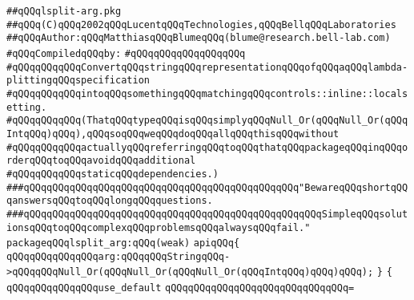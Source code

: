 \label{src/app/makelib/tools/main/lsplit-arg.pkg}
\verb|##qQQqlsplit-arg.pkg|\newline
\verb|##qQQq(C)qQQq2002qQQqLucentqQQqTechnologies,qQQqBellqQQqLaboratories|\newline
\verb|##qQQqAuthor:qQQqMatthiasqQQqBlumeqQQq(blume@research.bell-lab.com)|\newline
\newline
\verb|#qQQqCompiledqQQqby:|\newline
\verb|#qQQqqQQqqQQqqQQqqQQq|\newline
\newline
\verb|#qQQqqQQqqQQqConvertqQQqstringqQQqrepresentationqQQqofqQQqaqQQqlambda-plittingqQQqspecification|\newline
\verb|#qQQqqQQqqQQqintoqQQqsomethingqQQqmatchingqQQqcontrols::inline::localsetting.|\newline
\verb|#qQQqqQQqqQQq(ThatqQQqtypeqQQqisqQQqsimplyqQQqNull_Or(qQQqNull_Or(qQQqIntqQQq)qQQq),qQQqsoqQQqweqQQqdoqQQqallqQQqthisqQQqwithout|\newline
\verb|#qQQqqQQqqQQqactuallyqQQqreferringqQQqtoqQQqthatqQQqpackageqQQqinqQQqorderqQQqtoqQQqavoidqQQqadditional|\newline
\verb|#qQQqqQQqqQQqstaticqQQqdependencies.)|\newline
\newline
\newline
\newline
\verb|###qQQqqQQqqQQqqQQqqQQqqQQqqQQqqQQqqQQqqQQqqQQqqQQq"BewareqQQqshortqQQqanswersqQQqtoqQQqlongqQQqquestions.|\newline
\verb|###qQQqqQQqqQQqqQQqqQQqqQQqqQQqqQQqqQQqqQQqqQQqqQQqqQQqSimpleqQQqsolutionsqQQqtoqQQqcomplexqQQqproblemsqQQqalwaysqQQqfail."|\newline
\newline
\newline
\newline
\verb|packageqQQqlsplit_arg:qQQq(weak)|\newline
\verb|apiqQQq{|\newline
\verb|qQQqqQQqqQQqqQQqarg:qQQqqQQqStringqQQq->qQQqqQQqNull_Or(qQQqNull_Or(qQQqNull_Or(qQQqIntqQQq)qQQq)qQQq);|\newline
\verb|}|\newline
\verb|{|\newline
\verb|qQQqqQQqqQQqqQQquse_default|\newline
\verb|qQQqqQQqqQQqqQQqqQQqqQQqqQQqqQQq=|\newline
